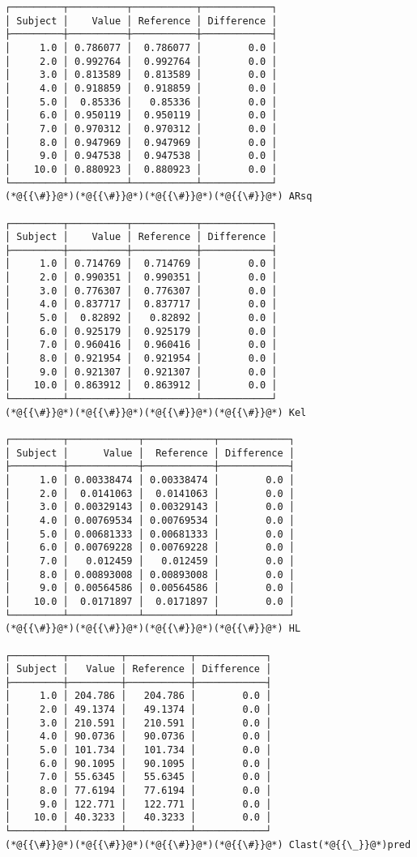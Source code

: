 \documentclass[12pt,a4paper]{article}
\begin{document}
\begin{lstlisting}
┌─────────┬──────────┬───────────┬────────────┐
│ Subject │    Value │ Reference │ Difference │
├─────────┼──────────┼───────────┼────────────┤
│     1.0 │ 0.786077 │  0.786077 │        0.0 │
│     2.0 │ 0.992764 │  0.992764 │        0.0 │
│     3.0 │ 0.813589 │  0.813589 │        0.0 │
│     4.0 │ 0.918859 │  0.918859 │        0.0 │
│     5.0 │  0.85336 │   0.85336 │        0.0 │
│     6.0 │ 0.950119 │  0.950119 │        0.0 │
│     7.0 │ 0.970312 │  0.970312 │        0.0 │
│     8.0 │ 0.947969 │  0.947969 │        0.0 │
│     9.0 │ 0.947538 │  0.947538 │        0.0 │
│    10.0 │ 0.880923 │  0.880923 │        0.0 │
└─────────┴──────────┴───────────┴────────────┘
(*@{{\#}}@*)(*@{{\#}}@*)(*@{{\#}}@*)(*@{{\#}}@*) ARsq

┌─────────┬──────────┬───────────┬────────────┐
│ Subject │    Value │ Reference │ Difference │
├─────────┼──────────┼───────────┼────────────┤
│     1.0 │ 0.714769 │  0.714769 │        0.0 │
│     2.0 │ 0.990351 │  0.990351 │        0.0 │
│     3.0 │ 0.776307 │  0.776307 │        0.0 │
│     4.0 │ 0.837717 │  0.837717 │        0.0 │
│     5.0 │  0.82892 │   0.82892 │        0.0 │
│     6.0 │ 0.925179 │  0.925179 │        0.0 │
│     7.0 │ 0.960416 │  0.960416 │        0.0 │
│     8.0 │ 0.921954 │  0.921954 │        0.0 │
│     9.0 │ 0.921307 │  0.921307 │        0.0 │
│    10.0 │ 0.863912 │  0.863912 │        0.0 │
└─────────┴──────────┴───────────┴────────────┘
(*@{{\#}}@*)(*@{{\#}}@*)(*@{{\#}}@*)(*@{{\#}}@*) Kel

┌─────────┬────────────┬────────────┬────────────┐
│ Subject │      Value │  Reference │ Difference │
├─────────┼────────────┼────────────┼────────────┤
│     1.0 │ 0.00338474 │ 0.00338474 │        0.0 │
│     2.0 │  0.0141063 │  0.0141063 │        0.0 │
│     3.0 │ 0.00329143 │ 0.00329143 │        0.0 │
│     4.0 │ 0.00769534 │ 0.00769534 │        0.0 │
│     5.0 │ 0.00681333 │ 0.00681333 │        0.0 │
│     6.0 │ 0.00769228 │ 0.00769228 │        0.0 │
│     7.0 │   0.012459 │   0.012459 │        0.0 │
│     8.0 │ 0.00893008 │ 0.00893008 │        0.0 │
│     9.0 │ 0.00564586 │ 0.00564586 │        0.0 │
│    10.0 │  0.0171897 │  0.0171897 │        0.0 │
└─────────┴────────────┴────────────┴────────────┘
(*@{{\#}}@*)(*@{{\#}}@*)(*@{{\#}}@*)(*@{{\#}}@*) HL

┌─────────┬─────────┬───────────┬────────────┐
│ Subject │   Value │ Reference │ Difference │
├─────────┼─────────┼───────────┼────────────┤
│     1.0 │ 204.786 │   204.786 │        0.0 │
│     2.0 │ 49.1374 │   49.1374 │        0.0 │
│     3.0 │ 210.591 │   210.591 │        0.0 │
│     4.0 │ 90.0736 │   90.0736 │        0.0 │
│     5.0 │ 101.734 │   101.734 │        0.0 │
│     6.0 │ 90.1095 │   90.1095 │        0.0 │
│     7.0 │ 55.6345 │   55.6345 │        0.0 │
│     8.0 │ 77.6194 │   77.6194 │        0.0 │
│     9.0 │ 122.771 │   122.771 │        0.0 │
│    10.0 │ 40.3233 │   40.3233 │        0.0 │
└─────────┴─────────┴───────────┴────────────┘
(*@{{\#}}@*)(*@{{\#}}@*)(*@{{\#}}@*)(*@{{\#}}@*) Clast(*@{{\_}}@*)pred


\end{lstlisting}
\end{document}
